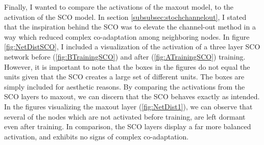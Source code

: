 Finally, I wanted to compare the activations of the maxout model, to the activation of the \ac{SCO} model. In section \ref{subsubsec:stochchannelout},
I stated that the inspiration behind the \ac{SCO} was to elevate the channel-out method in a way which reduced complex co-adaptation among neighboring
nodes. In figure \ref{fig:NetDistSCO}, I included a visualization of the activation of a three layer \ac{SCO} network before (\ref{fig:BTrainingSCO}) 
and after (\ref{fig:ATrainingSCO}) training. However, it is important to note that the boxes in the figures do not equal the units given that the \ac{SCO} 
creates a large set of different units. The boxes are simply included for aesthetic reasons. By comparing the activations from the \ac{SCO} 
layers to maxout, we can discern that the \ac{SCO} behaves exactly as intended. In the figures visualizing the maxout layer (\ref{fig:NetDist1}), we can observe 
that several of the nodes which are not activated before training, are left dormant even after training. In comparison, the \ac{SCO} layers display a far more balanced 
activation, and exhibits no signs of complex co-adaptation. 
